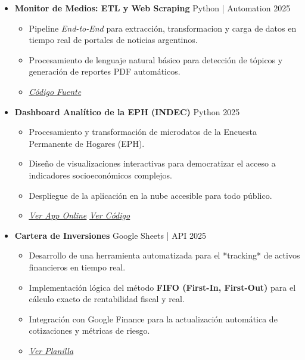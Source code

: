 \documentclass[11pt, a4paper]{article}
\newcommand{\projectHeader}[3]{
    \textbf{#1} \hfill {\footnotesize \color{accent} #2 \textbar{} #3}
}
\begin{document}
\begin{itemize}[leftmargin=*]
    \item \projectHeader{Monitor de Medios: ETL y Web Scraping}{Python | Automation}{2025}
    \begin{itemize}[label=\textbullet]
        \item Pipeline \textit{End-to-End} para extracción, transformacion y carga de datos en tiempo real de portales de noticias argentinos.
        \item Procesamiento de lenguaje natural básico para detección de tópicos y generación de reportes PDF automáticos.
        \item \href{https://github.com/JoacoLucen/scraping_web}{\faGithub{} \textit{Código Fuente}}
    \end{itemize}

    \item \projectHeader{Dashboard Analítico de la EPH (INDEC)}{Python}{2025}
    \begin{itemize}[label=\textbullet]
        \item Procesamiento y transformación de microdatos de la Encuesta Permanente de Hogares (EPH).
        \item Diseño de visualizaciones interactivas para democratizar el acceso a indicadores socioeconómicos complejos.
        \item Despliegue de la aplicación en la nube accesible para todo público.
        \item \href{https://eph-insight-app-joacolucentini.streamlit.app/}{\faGlobe{} \textit{\underline{Ver App Online}}} \textbar{} \href{https://github.com/JoacoLucen/EPH-Insight-App}{\faGithub{} \textit{\underline{Ver Código}}}
    \end{itemize}
    \vspace{4pt}

        \item \projectHeader{Cartera de Inversiones}{Google Sheets | API}{2025}
    \begin{itemize}[label=\textbullet]
        \item Desarrollo de una herramienta automatizada para el *tracking* de activos financieros en tiempo real.
        \item Implementación lógica del método \textbf{FIFO (First-In, First-Out)} para el cálculo exacto de rentabilidad fiscal y real.
        \item Integración con Google Finance para la actualización automática de cotizaciones y métricas de riesgo.
        \item \href{https://docs.google.com/spreadsheets/d/1MOAbafLv-NISA2nb2gy0AmwRGHegZyXV7TNal1StVgE/edit?usp=sharing}{\faTable{} \textit{\underline{Ver Planilla}}}
    \end{itemize}
    
\end{itemize}
\end{document}
